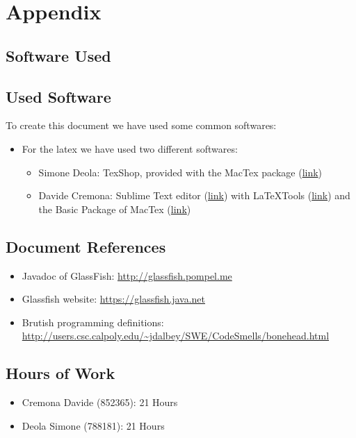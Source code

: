 \documentclass[../../dd.tex]{subfiles}
\begin{document}
	\chapter{Appendix}

		\section{Software Used}
		\section{Used Software}
		To create this document we have used some common softwares:
		\begin{itemize}
			\item For the latex we have used two different softwares:
			\begin{itemize}
			
			\item Simone Deola: TexShop, provided with the MacTex package 					(\href{https://tug.org/mactex/}{link})
			
		\item Davide Cremona: Sublime Text editor (\href{http://www.sublimetext.com}{link}) with LaTeXTools (\href{https://github.com/SublimeText/LaTeXTools}{link}) and the Basic Package of MacTex (\href{https://tug.org/mactex/}{link})

			\end{itemize}
		\end{itemize}

		\section{Document References}
		
		\begin{itemize}
		\item Javadoc of GlassFish: \url{http://glassfish.pompel.me}
		
		\item Glassfish website: \url{https://glassfish.java.net}
		
		\item Brutish programming definitions: \url{http://users.csc.calpoly.edu/~jdalbey/SWE/CodeSmells/bonehead.html }
		
		\end{itemize}
		
		
		\section{Hours of Work}
		\begin{itemize}
		\item Cremona Davide (852365): 21 Hours
		\item Deola Simone (788181): 21 Hours
		\end{itemize}
\end{document}
